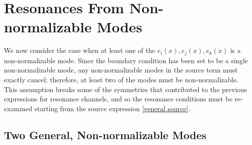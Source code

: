 \documentclass[letterpaper,11pt]{article}
\begin{document}

\section{Resonances From Non-normalizable Modes}

We now consider the case when at least one of the $e_i(x), e_j(x), e_k(x)$ is a non-normalizable mode. Since the boundary condition has been set to be a single non-normalizable mode, any non-normalizable modes in the source term must exactly cancel; therefore, at least two of the modes must be non-normalizable. This assumption breaks some of the symmetries that contributed to the previous expressions for resonance channels, and so the resonance conditions must be re-examined starting from the source expression \eqref{general source}.

\subsection{Two General, Non-normalizable Modes}
\end{document}
